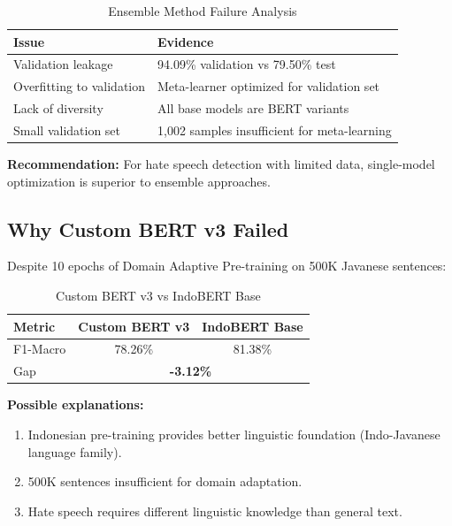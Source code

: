 \documentclass[10pt,journal]{IEEEtran}
\begin{document}
\begin{table}[H]
\centering
\caption{Ensemble Method Failure Analysis}
\label{tab:ensemble_fail}
\begin{tabular}{@{}ll@{}}
\toprule
\textbf{Issue} & \textbf{Evidence} \\ \midrule
Validation leakage & 94.09\% validation vs 79.50\% test \\
Overfitting to validation & Meta-learner optimized for validation set \\
Lack of diversity & All base models are BERT variants \\
Small validation set & 1,002 samples insufficient for meta-learning \\ \bottomrule
\end{tabular}
\end{table}

\textbf{Recommendation:} For hate speech detection with limited data, single-model optimization is superior to ensemble approaches.

\subsection{Why Custom BERT v3 Failed}

Despite 10 epochs of Domain Adaptive Pre-training on 500K Javanese sentences:

\begin{table}[H]
\centering
\caption{Custom BERT v3 vs IndoBERT Base}
\label{tab:custom_bert}
\begin{tabular}{@{}lcc@{}}
\toprule
\textbf{Metric} & \textbf{Custom BERT v3} & \textbf{IndoBERT Base} \\ \midrule
F1-Macro & 78.26\% & 81.38\% \\
Gap & \multicolumn{2}{c}{\textbf{-3.12\%}} \\ \bottomrule
\end{tabular}
\end{table}

\textbf{Possible explanations:}
\begin{enumerate}[leftmargin=*,noitemsep,topsep=0pt]
\item Indonesian pre-training provides better linguistic foundation (Indo-Javanese language family).
\item 500K sentences insufficient for domain adaptation.
\item Hate speech requires different linguistic knowledge than general text.
\end{enumerate}
\end{document}
